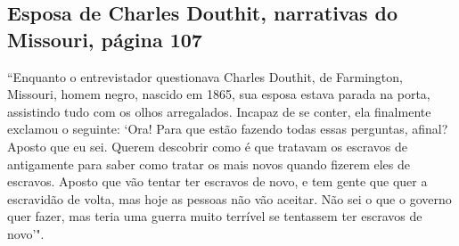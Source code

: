 \subsection{Esposa de Charles Douthit, narrativas do Missouri, página 107} \label{ref75}

``Enquanto o entrevistador questionava Charles Douthit, de
Farmington, Missouri, homem negro, nascido em 1865, sua esposa estava
parada na porta, assistindo tudo com os olhos arregalados. Incapaz de se
conter, ela finalmente exclamou o seguinte: `Ora! Para que estão fazendo
todas essas perguntas, afinal? Aposto que eu sei. Querem descobrir como
é que tratavam os escravos de antigamente para saber como tratar os mais
novos quando fizerem eles de escravos. Aposto que vão tentar ter
escravos de novo, e tem gente que quer a escravidão de volta, mas hoje
as pessoas não vão aceitar. Não sei o que o governo quer fazer, mas
teria uma guerra muito terrível se tentassem ter escravos de novo'".

\pagebreak
\thispagestyle{empty}
\movetoevenpage
\thispagestyle{empty}

